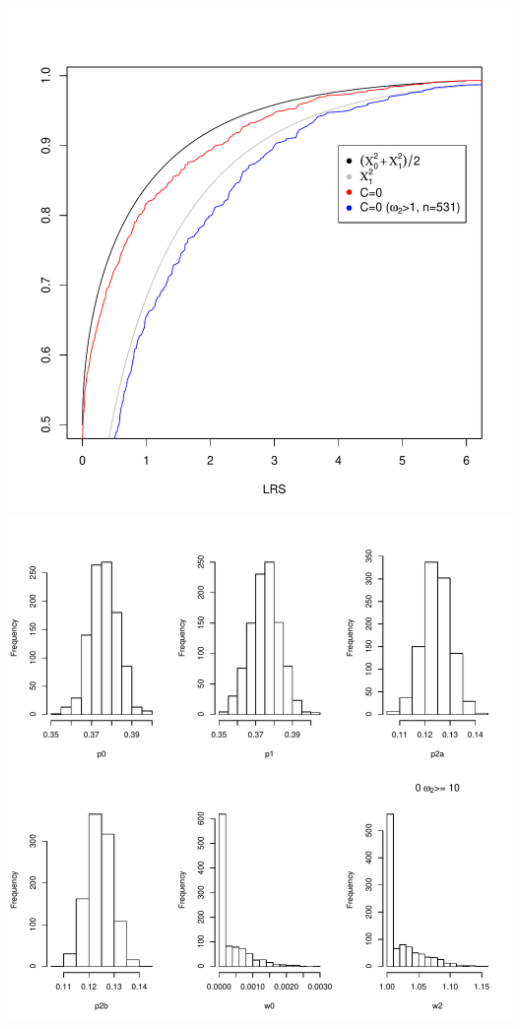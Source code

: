 \documentclass[12pt,letterpaper]{article}\usepackage[]{graphicx}\usepackage[]{color}
\makeatletter
\def\maxwidth{ %
  \ifdim\Gin@nat@width>\linewidth
    \linewidth
  \else
    \Gin@nat@width
  \fi
}
\newenvironment{knitrout}{}{} %
\makeatother
\begin{document}
\begin{knitrout}
{\centering \includegraphics[width=\maxwidth]{figures/data-1} 
\includegraphics[width=\maxwidth]{figures/data-2} 

}



\end{knitrout}
\end{document}
